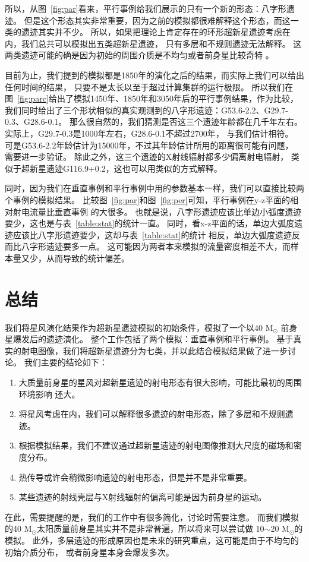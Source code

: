 所以，从图~\ref{fig:par}看来，平行事例给我们展示的只有一个新的形态：八字形遗迹。
但是这个形态其实非常重要，因为之前的模拟都很难解释这个形态，而这一类的遗迹其实并不少。
所以，如果把理论上肯定存在的环形超新星遗迹考虑在内，我们总共可以模拟出五类超新星遗迹，
只有多层和不规则遗迹无法解释。
这两类遗迹可能的确是因为初始的周围介质是不均匀或者前身星比较奇特
\citep{Orlando2007,Orlando2017}。

目前为止，我们提到的模拟都是1850年的演化之后的结果，而实际上我们可以给出任何时间的结果，
只要不是太长以至于超过计算集群的运行极限。
所以我们在图~\ref{fig:parc}给出了模拟1450年、1850年和3050年后的平行事例结果，作为比较，
我们同时给出了三个形状相似的真实观测到的八字形遗迹：G53.6-2.2、G29.7-0.3、G28.6-0.1。
那么很自然的，我们猜测是否这三个遗迹年龄都在几千年左右。
实际上，G29.7-0.3是1000年左右\citep{Leahy2008}，G28.6-0.1不超过2700年\citep{Bamba2001}，
与我们估计相符。
可是G53.6-2.2年龄估计为15000年\citet{Long1991}，不过其年龄估计所用的距离很可能有问题，
需要进一步验证。
除此之外，这三个遗迹的X射线辐射都多少偏离射电辐射\citep{Broersen2015,Su2009,Bamba2001}，
类似于超新星遗迹G116.9+0.2，这也可以用类似的方式解释。

同时，因为我们在垂直事例和平行事例中用的参数基本一样，我们可以直接比较两个事例的模拟结果。
比较图~\ref{fig:par}和图~\ref{fig:per}可知，平行事例在y-z平面的相对射电流量比垂直事例
的大很多。
也就是说，八字形遗迹应该比单边小弧度遗迹要少，这也是与表~\ref{table:stat}的统计一直。
同时，看x-z平面的话，单边大弧度遗迹应该比八字形遗迹要少，这却与表~\ref{table:stat}的统计
相反，单边大弧度遗迹反而比八字形遗迹要多一点。
这可能因为两者本来模拟的流量密度相差不大，而样本量又少，从而导致的统计偏差。

\section{总结}
\label{SWsum}
我们将星风演化结果作为超新星遗迹模拟的初始条件，模拟了一个以40  M$_{\odot}$
前身星爆发后的遗迹演化。
整个工作包括了两个模拟：垂直事例和平行事例。
基于真实的射电图像，我们将超新星遗迹分为七类，并以此结合模拟结果做了进一步讨论。
我们主要的结论如下：

\begin{enumerate}

    \item 大质量前身星的星风对超新星遗迹的射电形态有很大影响，可能比最初的周围环境影响
    还大。

    \item 将星风考虑在内，我们可以解释很多遗迹的射电形态，除了多层和不规则遗迹。

    \item 根据模拟结果，我们不建议通过超新星遗迹的射电图像推测大尺度的磁场和密度分布。

    \item 热传导或许会稍微影响遗迹的射电形态，但是并不是非常重要。

    \item 某些遗迹的射线壳层与X射线辐射的偏离可能是因为前身星的运动。

\end{enumerate}

在此，需要提醒的是，我们的工作中有很多简化，讨论时需要注意。
而我们模拟的40 M$_{\odot}$太阳质量前身星其实并不是非常普遍，所以将来可以尝试做
10$\sim$20 M$_{\odot}$的模拟。
此外，多层遗迹的形成原因也是未来的研究重点，这可能是由于不均匀的初始介质分布，
或者前身星本身会爆发多次。
